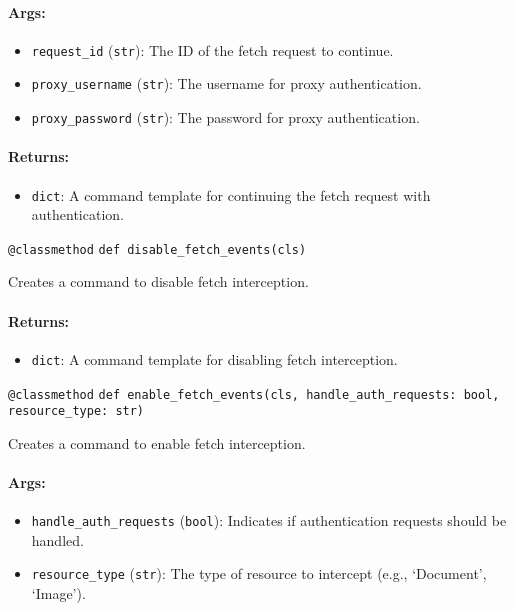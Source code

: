 \documentclass{article}
\begin{document}
\paragraph{Args:}
\begin{itemize}
    \item \texttt{request\_id} (\texttt{str}): The ID of the fetch request to continue.
    \item \texttt{proxy\_username} (\texttt{str}): The username for proxy authentication.
    \item \texttt{proxy\_password} (\texttt{str}): The password for proxy authentication.
\end{itemize}

\paragraph{Returns:}
\begin{itemize}
    \item \texttt{dict}: A command template for continuing the fetch request with authentication.
\end{itemize}

\noindent\texttt{@classmethod}
\noindent\texttt{def disable\_fetch\_events(cls)}

\noindent Creates a command to disable fetch interception.

\paragraph{Returns:}
\begin{itemize}
    \item \texttt{dict}: A command template for disabling fetch interception.
\end{itemize}

\noindent\texttt{@classmethod}
\noindent\texttt{def enable\_fetch\_events(cls, handle\_auth\_requests: bool, resource\_type: str)}

\noindent Creates a command to enable fetch interception.

\paragraph{Args:}
\begin{itemize}
    \item \texttt{handle\_auth\_requests} (\texttt{bool}): Indicates if authentication requests should be handled.
    \item \texttt{resource\_type} (\texttt{str}): The type of resource to intercept (e.g., `Document', `Image').
\end{itemize}
\end{document}

